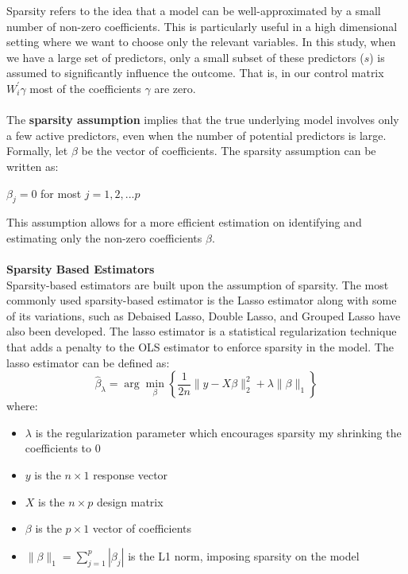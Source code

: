 Sparsity refers to the idea that a model can be well-approximated by a small number of non-zero coefficients. This is particularly useful in a high dimensional setting where we want to choose only the relevant variables. In this study, when we have a large set of predictors, only a small subset of these predictors ($s$) is assumed to significantly influence the outcome. That is, in our control matrix $W_i^{\prime} \gamma$ most of the coefficients $\gamma$ are zero. 
\\
\\ 
The \textbf{sparsity assumption} implies that the true underlying model involves only a few active predictors, even when the number of potential predictors is large. Formally, let $\beta$ be the vector of coefficients. The sparsity assumption can be written as:
\begin{center}
    $\beta_j = 0$ for most $j = 1, 2, ...p$
\end{center}
This assumption allows for a more efficient estimation on identifying and estimating only the non-zero coefficients $\beta$.\\
\\ 
\textbf{Sparsity Based Estimators}\\
Sparsity-based estimators are built upon the assumption of sparsity. The most commonly used sparsity-based estimator is the Lasso estimator along  with some of its variations, such as Debaised Lasso, Double Lasso, and Grouped Lasso have also been developed. The lasso estimator is a statistical regularization technique that adds a penalty to the OLS estimator to enforce sparsity in the model. The lasso estimator can be defined as: 
\[
\hat{\beta}_\lambda = \arg\min_{\beta} \left\{ \frac{1}{2n} \| y - X\beta \|_2^2 + \lambda \|\beta\|_1 \right\}
\]
where:
\begin{itemize}
    \item $\lambda$ is the regularization parameter which encourages sparsity my shrinking the coefficients to 0
    \item $y$ is the $n \times 1$ response vector
    \item $X$ is the $n \times p$ design matrix
    \item $\beta$ is the $p \times 1$ vector of coefficients
    \item $\|\beta\|_1 = \sum_{j=1}^{p} |\beta_j|$ is the L1 norm, imposing sparsity on the model
\end{itemize}

